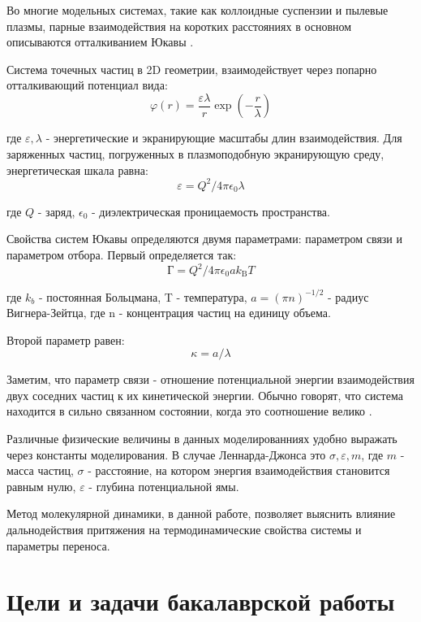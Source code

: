 Во многие модельных системах, такие как коллоидные суспензии и пылевые плазмы, парные взаимодействия на коротких расстояниях в основном описываются отталкиванием Юкавы \cite{gel4}.

Система точечных частиц в 2D геометрии, взаимодействует через попарно отталкивающий потенциал вида:
\begin{equation}
\varphi(r)=\frac{\varepsilon \lambda}{r} \exp \left(-\frac{r}{\lambda}\right)
\end{equation}

где $\varepsilon, \lambda$ - энергетические и экранирующие масштабы длин взаимодействия. Для заряженных частиц, погруженных в плазмоподобную экранирующую среду, энергетическая шкала равна:
\begin{equation}
\varepsilon=Q^{2} / 4 \pi \epsilon_{0} \lambda
\end{equation}

где $Q$ - заряд, $\epsilon_{0}$ - диэлектрическая проницаемость пространства.

Свойства систем Юкавы определяются двумя параметрами: параметром связи и параметром отбора. Первый определяется так:
\begin{equation}
\text{Г}=Q^{2} / 4 \pi \epsilon_{0} a k_{\mathrm{B}} T
\end{equation}

где $k_b$ - постоянная Больцмана, T - температура, $a=(\pi n)^{-1 / 2}$ - радиус Вигнера-Зейтца, где n - концентрация частиц на единицу объема.

Второй параметр равен:
\begin{equation}\kappa=a / \lambda\end{equation}

Заметим, что параметр связи - отношение потенциальной энергии взаимодействия двух соседних частиц к их кинетической энергии. Обычно говорят, что система находится в сильно связанном состоянии, когда это соотношение велико \cite{gel4}.

Различные физические величины в данных моделированниях удобно выражать через константы моделирования. В случае Леннарда-Джонса это  $\sigma, \varepsilon, m$, где $m$ - масса частиц, $\sigma$ - расстояние, на котором энергия взаимодействия становится равным нулю, $\varepsilon$ - глубина потенциальной ямы.

Метод молекулярной динамики, в данной работе, позволяет выяснить влияние дальнодействия притяжения на термодинамические свойства системы и параметры переноса.

\section{Цели и задачи бакалаврской работы}

